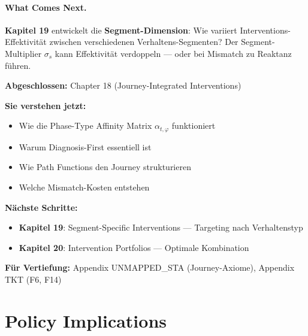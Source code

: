 \paragraph{What Comes Next.}
\textbf{Kapitel 19} entwickelt die \textbf{Segment-Dimension}: Wie variiert Interventions-Effektivität zwischen verschiedenen Verhaltens-Segmenten? Der Segment-Multiplier $\sigma_s$ kann Effektivität verdoppeln --- oder bei Mismatch zu Reaktanz führen.



\begin{tcolorbox}[colback=gray!5!white, colframe=gray!75!black,
    title=Empfohlene Lesepfade]

\textbf{Abgeschlossen:} Chapter 18 (Journey-Integrated Interventions)

\textbf{Sie verstehen jetzt:}
\begin{itemize}[nosep]
\item Wie die Phase-Type Affinity Matrix $\alpha_{t,\varphi}$ funktioniert
\item Warum Diagnosis-First essentiell ist
\item Wie Path Functions den Journey strukturieren
\item Welche Mismatch-Kosten entstehen
\end{itemize}

\textbf{Nächste Schritte:}
\begin{itemize}[nosep]
\item \textbf{Kapitel 19}: Segment-Specific Interventions --- Targeting nach Verhaltenstyp
\item \textbf{Kapitel 20}: Intervention Portfolios --- Optimale Kombination
\end{itemize}

\textbf{Für Vertiefung:} Appendix UNMAPPED_STA (Journey-Axiome), Appendix TKT (F6, F14)
\end{tcolorbox}



\section*{Policy Implications}

